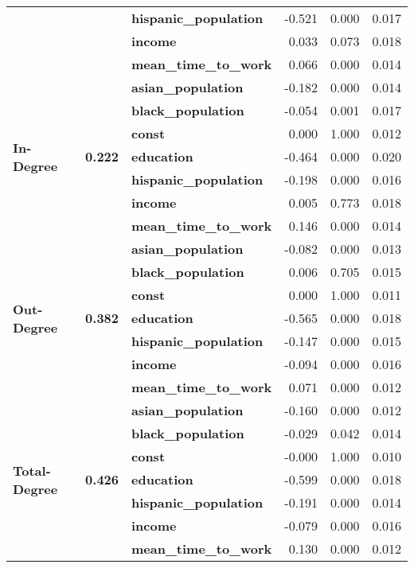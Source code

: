 \begin{tabular}{lllrrr}
             &       & \textbf{hispanic\_population} & -0.521 &    0.000 &    0.017 \\
             &       & \textbf{income} &  0.033 &    0.073 &    0.018 \\
             &       & \textbf{mean\_time\_to\_work} &  0.066 &    0.000 &    0.014 \\
\cline{1-6}
\cline{2-6}
\multirow{7}{*}{\textbf{In-Degree}} & \multirow{7}{*}{\textbf{0.222}} & \textbf{asian\_population} & -0.182 &    0.000 &    0.014 \\
             &       & \textbf{black\_population} & -0.054 &    0.001 &    0.017 \\
             &       & \textbf{const} &  0.000 &    1.000 &    0.012 \\
             &       & \textbf{education} & -0.464 &    0.000 &    0.020 \\
             &       & \textbf{hispanic\_population} & -0.198 &    0.000 &    0.016 \\
             &       & \textbf{income} &  0.005 &    0.773 &    0.018 \\
             &       & \textbf{mean\_time\_to\_work} &  0.146 &    0.000 &    0.014 \\
\cline{1-6}
\cline{2-6}
\multirow{7}{*}{\textbf{Out-Degree}} & \multirow{7}{*}{\textbf{0.382}} & \textbf{asian\_population} & -0.082 &    0.000 &    0.013 \\
             &       & \textbf{black\_population} &  0.006 &    0.705 &    0.015 \\
             &       & \textbf{const} &  0.000 &    1.000 &    0.011 \\
             &       & \textbf{education} & -0.565 &    0.000 &    0.018 \\
             &       & \textbf{hispanic\_population} & -0.147 &    0.000 &    0.015 \\
             &       & \textbf{income} & -0.094 &    0.000 &    0.016 \\
             &       & \textbf{mean\_time\_to\_work} &  0.071 &    0.000 &    0.012 \\
\cline{1-6}
\cline{2-6}
\multirow{7}{*}{\textbf{Total-Degree}} & \multirow{7}{*}{\textbf{0.426}} & \textbf{asian\_population} & -0.160 &    0.000 &    0.012 \\
             &       & \textbf{black\_population} & -0.029 &    0.042 &    0.014 \\
             &       & \textbf{const} & -0.000 &    1.000 &    0.010 \\
             &       & \textbf{education} & -0.599 &    0.000 &    0.018 \\
             &       & \textbf{hispanic\_population} & -0.191 &    0.000 &    0.014 \\
             &       & \textbf{income} & -0.079 &    0.000 &    0.016 \\
             &       & \textbf{mean\_time\_to\_work} &  0.130 &    0.000 &    0.012 \\
\bottomrule
\end{tabular}
